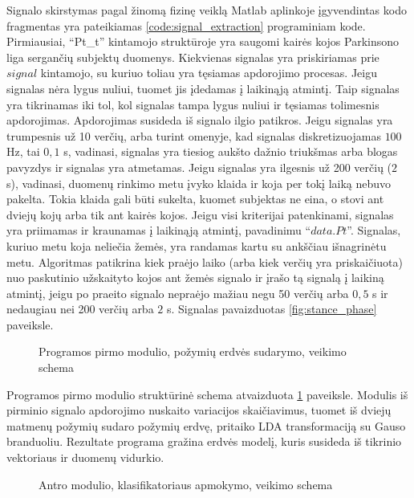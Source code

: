 \documentclass[]{vgtuef}
\begin{document}
Signalo skirstymas pagal žinomą fizinę veiklą Matlab aplinkoje įgyvendintas kodo fragmentas yra pateikiamas \ref{code:signal_extraction} programiniam kode. Pirmiausiai, ``Pt\_t'' kintamojo struktūroje yra saugomi kairės kojos Parkinsono liga sergančių subjektų duomenys. Kiekvienas signalas yra priskiriamas prie $signal$ kintamojo, su kuriuo toliau yra tęsiamas apdorojimo procesas. Jeigu signalas nėra lygus nuliui, tuomet jis įdedamas į laikinąją atmintį. Taip signalas yra tikrinamas iki tol, kol signalas tampa lygus nuliui ir tęsiamas tolimesnis apdorojimas. Apdorojimas susideda iš signalo ilgio patikros. Jeigu signalas yra trumpesnis už 10 verčių, arba turint omenyje, kad signalas diskretizuojamas $100$ Hz, tai $0,1$ s, vadinasi, signalas yra tiesiog aukšto dažnio triukšmas arba blogas pavyzdys ir signalas yra atmetamas. Jeigu signalas yra ilgesnis už 200 verčių ($2$ s), vadinasi, duomenų rinkimo metu įvyko klaida ir koja per tokį laiką nebuvo pakelta. Tokia klaida gali būti sukelta, kuomet subjektas ne eina, o stovi ant dviejų kojų arba tik ant kairės kojos. Jeigu visi kriterijai patenkinami, signalas yra priimamas ir kraunamas į laikinąją atmintį, pavadinimu ``$data.Pt$''. Signalas, kuriuo metu koja neliečia žemės, yra randamas kartu su ankščiau išnagrinėtu metu. Algoritmas patikrina kiek praėjo laiko (arba kiek verčių yra priskaičiuota) nuo paskutinio užskaityto kojos ant žemės signalo ir įrašo tą signalą į laikiną atmintį, jeigu po praeito signalo nepraėjo mažiau negu 50 verčių arba $0,5$ s ir nedaugiau nei 200 verčių arba $2$ s. Signalas pavaizduotas \ref{fig:stance_phase} paveiksle.

\begin{figure}
  \centering
  
  \caption{Programos pirmo modulio, požymių erdvės sudarymo, veikimo schema}
  \label{fig:pirma_faze}
\end{figure}

Programos pirmo modulio struktūrinė schema atvaizduota \ref{fig:pirma_faze} paveiksle. Modulis iš pirminio signalo apdorojimo nuskaito variacijos skaičiavimus, tuomet iš dviejų matmenų požymių sudaro požymių erdvę, pritaiko LDA transformaciją su Gauso branduoliu. Rezultate programa gražina erdvės modelį, kuris susideda iš tikrinio vektoriaus ir duomenų vidurkio.


\begin{figure}
  \centering
  
  \caption{Antro modulio, klasifikatoriaus apmokymo, veikimo schema}
  \label{fig:antra_faze}
\end{figure}
\end{document}
